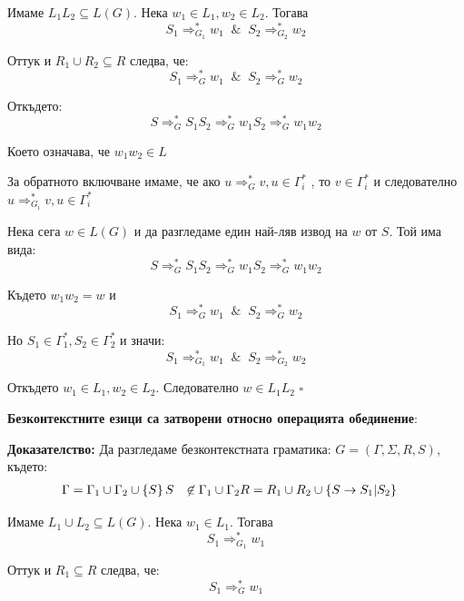 \documentclass{article}
\renewcommand{\\}{\newline}
\newcommand{\amp}{\;\&\;}
\newcommand{\doc}{\textbf{Доказателство: }}
\newcommand{\proven}{\hfill $\square$}
\begin{document}
      Имаме \(L_{1}L_{2}\subseteq L(G)\). Нека \(w_1 \in L_1, w_2 \in L_2\). Тогава \[
        S_{1} \Rightarrow^{*}_{G_1}w_{1} \;\amp\; S_{2} \Rightarrow^{*}_{G_2}w_{2}
      \]   

      Оттук и \(R_{1} \cup R_{2} \subseteq R\) следва, че: \[
        S_{1} \Rightarrow^{*}_{G}w_{1} \;\amp\; S_{2} \Rightarrow^{*}_{G}w_{2}
      \] 

      Откъдето: \[
        S\Rightarrow^{*}_{G}S_{1}S_{2} \Rightarrow^{*}_{G}w_{1}S_2 \Rightarrow^{*}_{G}w_{1}w_{2}
      \] 

      Което означава, че \(w_{1}w_{2} \in L\)  

      За обратното включване имаме, че ако \(u \Rightarrow_{G}^{*} v, u \in \Gamma^{*}_{i}\) , то \(v \in \Gamma^{*}_{i}\) и следователно \(u \Rightarrow_{G_{i}}^{*} v, u \in \Gamma^{*}_{i}\) 

      Нека сега \(w \in L(G)\) и да разгледаме един най-ляв извод на \(w\) от \(S\). Той има вида:    \[
        S\Rightarrow^{*}_{G}S_{1}S_{2} \Rightarrow^{*}_{G}w_{1}S_2 \Rightarrow^{*}_{G}w_{1}w_{2}
      \] 

      Където \(w_{1}w_{2} = w\) и  \[
        S_{1} \Rightarrow^{*}_{G}w_{1} \;\amp\; S_{2} \Rightarrow^{*}_{G}w_{2}
      \] 

      Но \(S_{1} \in \Gamma^{*}_{1}, S_{2} \in \Gamma^{*}_{2}\) и значи: \[
        S_{1} \Rightarrow^{*}_{G_1}w_{1} \;\amp\; S_{2} \Rightarrow^{*}_{G_2}w_{2}
      \]  

      Откъдето \(w_{1} \in L_{1}, w_{2} \in L_{2}\). Следователно \(w \in L_{1}L_{2}\) \proven


      \textbf{Безконтекстните езици са затворени относно операцията обединение}:

      \doc Да разгледаме безконтекстната граматика: \(G = \left(\Gamma, \Sigma, R, S\right)\), където: \begin{align*}
        \Gamma &= \Gamma_1 \cup \Gamma_2 \cup \left\{S\right\} \\
        S &\not\in \Gamma_1 \cup \Gamma_2 \\
        R &= R_{1} \cup R_{2} \cup \left\{S \to S_1 | S_2\right\}
      \end{align*}

      Имаме \(L_{1}\cup L_{2}\subseteq L(G)\). Нека \(w_1 \in L_1\). Тогава \[
        S_{1} \Rightarrow^{*}_{G_1}w_{1} 
      \]   

      Оттук и \(R_{1} \subseteq R\) следва, че: \[
        S_{1} \Rightarrow^{*}_{G}w_{1} 
      \] 
\end{document}
